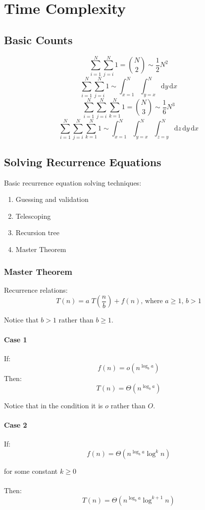 \chapter{Time Complexity}

\section{Basic Counts}
$$
\sum_{i=1}^N{\sum_{j=i}^N{1}} = {N \choose 2} \sim \frac{1}{2} N^2
$$
$$
\sum_{i=1}^N{\sum_{j=i}^N{1}} \sim \int_{x=1}^N \int_{y=x}^N  \mathrm{d}y\, \mathrm{d}x
$$
$$
\sum_{i=1}^N{\sum_{j=i}^N{\sum_{k=1}^N{1}}} = {N \choose 3} \sim \frac{1}{6} N^3
$$
$$
\sum_{i=1}^N{\sum_{j=i}^N{\sum_{k=1}^N{1}}} \sim \int_{x=1}^N \int_{y=x}^N \int_{z=y}^N \mathrm{d}z\,
\mathrm{d}y\, \mathrm{d}x
$$

\section{Solving Recurrence Equations}
Basic recurrence equation solving techniques:
\begin{enumerate}
\item Guessing and validation
\item Telescoping
\item Recursion tree
\item Master Theorem
\end{enumerate}

\subsection{Master Theorem}
Recurrence relations:
$$T(n) = a \; T\!\left(\frac{n}{b}\right) + f(n)\mbox{, where }a \geq 1 \mbox{, } b > 1$$

Notice that $b>1$ rather than $b\geq1$.

\subsubsection*{Case 1}
If:
$$f(n) = o(n^{\log_b a})$$
Then:
$$T(n) = \Theta(n^{\log_b a})$$

Notice that in the condition it is $o$ rather than $O$. 
\subsubsection*{Case 2}
If:
$$f(n) = \Theta(n^{\log_b a} \log^{k} n)$$

for some constant $k \geq 0$\\\\
Then:
$$
T(n) = \Theta(n^{\log_b a} \log^{k+1} n)
$$

